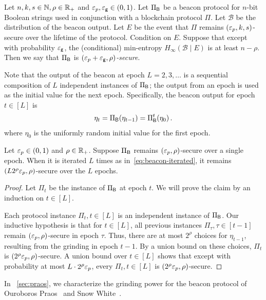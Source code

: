\begin{definition}\label{def:beacon-security}
    Let $n,k,s \in \mathbb{N}, \rho \in \mathbb{R}_+$ and $\mathsf{\varepsilon}_p, \mathsf{\varepsilon_g} \in (0,1)$.
    Let $\Pi_{\mathsf{B}}$ be a beacon protocol for $n$-bit Boolean strings 
    used in conjunction with a blockchain protocol $\Pi$. 
    Let $\mathcal{B}$ be the distribution of the beacon output.
    Let $E$ be the event that $\Pi$ remains $(\mathsf{\varepsilon}_p, k, s)$-secure over the lifetime of the protocol. 
    Condition on $E$. 
    Suppose that except with probability $\mathsf{\varepsilon_g}$, 
    the (conditional) min-entropy 
    $H_\infty(\mathcal{B} \mid E)$ is at least $n - \rho$. 
    Then we say that $\Pi_{\mathsf{B}}$ is \emph{$(\mathsf{\varepsilon}_p + \mathsf{\varepsilon_g}, \rho)$-secure}.
\end{definition}



Note that the output of the beacon at epoch $L = 2, 3, \ldots$  
is a sequential composition of $L$ independent instances of $\Pi_{\mathsf{B}}$; 
the output from an epoch is used as the initial value for the next epoch. 
Specifically, 
the beacon output for epoch $t \in [L]$ is 
\begin{align}\label{eq:beacon-iterated}
    \eta_t = \Pi_{\mathsf{B}}(\eta_{t-1}) = \Pi_{\mathsf{B}}^t(\eta_0)\,.
\end{align}
where $\eta_0$ is the uniformly random initial value for the first epoch.


\begin{lemma}\label{lemma:beacon-composition}
Let $\mathsf{\varepsilon}_p \in (0,1)$ and $\rho \in \mathbb{R}_+$.
Suppose $\Pi_{\mathsf{B}}$ remains $(\mathsf{\varepsilon}_p, \rho)$-secure over a single epoch. 
When it is iterated $L$ times as in~\eqref{eq:beacon-iterated}, 
it remains $\left(L 2^\rho \mathsf{\varepsilon}_p, \rho\right)$-secure 
over the $L$ epochs.
\end{lemma}
\begin{proof}
    Let $\Pi_t$ be the instance of $\Pi_{\mathsf{B}}$ at epoch $t$. 
    We will prove the claim by an induction on $t \in [L]$. 

    Each protocol instance $\Pi_t, t \in [L]$ 
    is an independent instance of $\Pi_{\mathsf{B}}$. 
    Our inductive hypothesis is that for $t \in [L]$, 
    all previous instances 
    $\Pi_\tau, \tau \in [t-1]$ remain $(\mathsf{\varepsilon}_p, \rho)$-secure in epoch $\tau$. 
    Thus, there are at most $2^\rho$ choices for $\eta_{t - 1}$, 
    resulting from the grinding in epoch $t-1$.
    By a union bound on these choices, $\Pi_t$ is $(2^\rho \mathsf{\varepsilon}_p, \rho)$-secure. 
    A union bound over $t \in [L]$ shows that 
    except with probability at most $L\cdot 2^\rho \mathsf{\varepsilon}_p$, 
    every $\Pi_t, t \in [L]$ is $(2^\rho \mathsf{\varepsilon}_p, \rho)$-secure.
\end{proof}


In \Section~\ref{sec:praos}, we characterize the grinding power 
for the beacon protocol of Ouroboros Praos~\cite{Praos} and Snow White~\cite{SnowWhite}.





